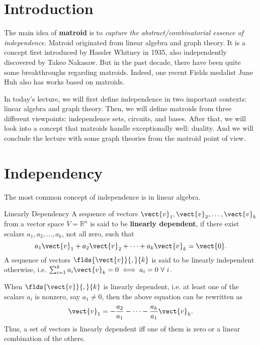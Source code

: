 \documentclass[a4paper,10pt]{article}
\renewcommand{\vocab}[1]{\textbf{#1}}
\begin{document}
\maketitle
\tableofcontents

\section{Introduction}

The main idea of \textbf{matroid} is to \emph{capture the abstract/combinatorial essence of independence}. Matroid originated from linear algebra and graph theory. It is a concept first introduced by Hassler Whitney in 1935, also independently discovered by Takeo Nakasaw. But in the past decade, there have been quite some breakthroughs regarding matroids. Indeed, one recent Fields medalist June Huh also has works based on matroids.

In today's lecture, we will first define independence in two important contexts: linear algebra and graph theory. Then, we will define matroids from three different viewpoints: independence sets, circuits, and bases. After that, we will look into a concept that matroids handle exceptionally well: duality. And we will conclude the lecture with some graph theories from the matroid point of view.

\section{Independency}


The most common concept of independence is in linear algebra.

\begin{definition}{Linearly Dependency}
  A sequence of vectors $\vect{v}_1,\vect{v}_2,\dots ,\vect{v}_k$ from a vector space $V=\mathbb{R}^n$ is said to be \vocab{linearly dependent}, if there exist scalars $a_1,a_2,\dots ,a_k$, not all zero, such that
  \[
    a_1\vect{v}_1+a_2\vect{v}_2+\cdots +a_k\vect{v}_k=\vect{0}.
  \]
  A sequence of vectors $\flds{\vect{v}}{,}{k}$ is said to be linearly independent otherwise, i.e. $\sum_{i=1}^{k}a_i\vect{v}_k=0\iff a_i=0\ \forall\ i$.
  \begin{remark}
    When $\flds{\vect{v}}{,}{k}$ is linearly dependent, i.e. at least one of the scalars $a_i$ is nonzero, say $a_1\neq 0$, then the above equation can be rewritten as
    \[
      \vect{v}_1=-\frac{a_2}{a_1}-\cdots -\frac{a_k}{a_1}\vect{v}_k.
    \]
    Thus, a set of vectors is linearly dependent iff one of them is zero or a linear combination of the others.
  \end{remark}
\end{definition}
\end{document}
